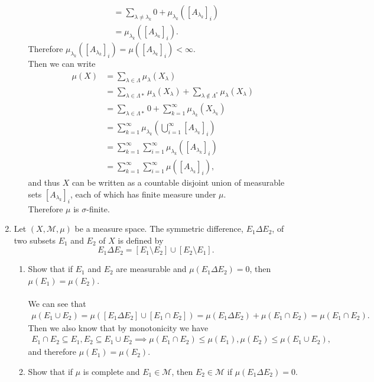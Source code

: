 \begin{enumerate}
\begin{enumerate}[label=(\roman*),align=left]
\begin{align*}
			&=\sum_{\lambda\neq\lambda_k} 0+\mu_{\lambda_k}([A_{\lambda_k}]_i)\\
			&=\mu_{\lambda_k}([A_{\lambda_k}]_i).
		\end{align*}
		Therefore $\mu_{\lambda_k}([A_{\lambda_k}]_i)=\mu([A_{\lambda_k}]_i)<\infty$.
		\\Then we can write
		\begin{align*}
			\mu(X)&=\sum_{\lambda\in\Lambda} \mu_\lambda(X_\lambda)\\		
			&=\sum_{\lambda\in\Lambda*} \mu_\lambda(X_\lambda)+\sum_{\lambda\notin\Lambda^*} \mu_\lambda(X_\lambda)\\	
			&=\sum_{\lambda\in\Lambda*} 0+\sum_{k=1}^\infty \mu_{\lambda_{k}}(X_{\lambda_{k}})\\
			&=\sum_{k=1}^\infty \mu_{\lambda_{k}}(\bigcup_{i=1}^\infty [A_{\lambda_k}]_i)\\
			&=\sum_{k=1}^\infty \sum_{i=1}^\infty \mu_{\lambda_{k}}( [A_{\lambda_k}]_i)\\
			&=\sum_{k=1}^\infty\sum_{i=1}^\infty \mu([A_{\lambda_k}]_i),
		\end{align*}
		and thus $X$ can be written as a countable disjoint union of measurable sets $[A_{\lambda_k}]_i$, each of which has finite measure under $\mu$.
		\\Therefore $\mu$ is $\sigma$-finite.
	\end{enumerate}
	\item Let $(X,\mathcal{M},\mu)$ be a measure space. The symmetric difference, $E_1\Delta E_2$, of two subsets $E_1$ and $E_2$ of $X$ is defined by
	\[
		E_1\Delta E_2=[E_1\setminus E_2]\cup[E_2\setminus E_1].
	\]
	\begin{enumerate}[label=(\roman*),align=left]   
		\item Show that if $E_1$ and $E_2$ are measurable and $\mu(E_1\Delta E_2)=0$, then $\mu(E_1)=\mu(E_2)$.\\
		\\We can see that
		\begin{align*}
			\mu(E_1\cup E_2)=\mu([E_1\Delta E_2]\cup[E_1\cap E_2])=\mu(E_1\Delta E_2)+\mu(E_1\cap E_2)=\mu(E_1\cap E_2).
		\end{align*}
		Then we also know that by monotonicity we have
		\begin{align*}
			E_1\cap E_2\subseteq E_1,E_2\subseteq E_1\cup E_2\implies\mu(E_1\cap E_2)\le\mu(E_1),\mu(E_2)\le\mu(E_1\cup E_2),
		\end{align*}
		and therefore $\mu(E_1)=\mu(E_2)$.
		\item Show that if $\mu$ is complete and $E_1\in\mathcal{M}$, then $E_2\in\mathcal{M}$ if $\mu(E_1\Delta E_2)=0$.\\

\end{enumerate}
\end{enumerate}
